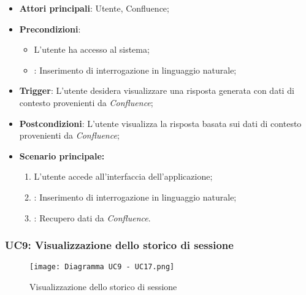 \hypertarget{UC8.3}{}
\begin{itemize}
    \item \textbf{Attori principali}: Utente, Confluence;
    \item \textbf{Precondizioni}: 
    \begin{itemize}
        \item L'utente ha accesso al sistema;
        \item {}: Inserimento di interrogazione in linguaggio naturale;
    \end{itemize}
    \item \textbf{Trigger}: L'utente desidera visualizzare una risposta generata con dati di contesto provenienti da \emph{Confluence};
    \item \textbf{Postcondizioni}: L'utente visualizza la risposta basata sui dati di contesto provenienti da \emph{Confluence};
    \item \textbf{Scenario principale:}
    \begin{enumerate}
        \item L'utente accede all'interfaccia dell'applicazione;
        \item {}: Inserimento di interrogazione in linguaggio naturale;
        \item {}: Recupero dati da \emph{Confluence}.
    \end{enumerate}
\end{itemize}




\newpage
\hypertarget{UC9}{}
\subsubsection{UC9: Visualizzazione dello storico di sessione}

\begin{figure}[h]
    \centering
    \texttt{[image: Diagramma UC9 - UC17.png]}
    \caption{Visualizzazione dello storico di sessione}
\end{figure}

